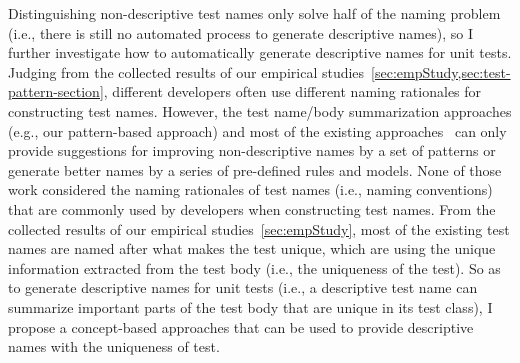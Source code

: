 Distinguishing non-descriptive test names only solve half of the naming problem (i.e., there is still no automated process to generate descriptive names), so I further investigate how to automatically generate descriptive names for unit tests.
%
Judging from the collected results of our empirical studies~\cref{sec:empStudy,sec:test-pattern-section}, different developers often use different naming rationales for constructing test names.
%
However, the test name\slash body summarization approaches (e.g., our pattern-based approach) and most of the existing approaches~\cite{arcuri2014automated,zhang2015automatically,allamanis2015suggesting,daka2017generating,li2019deepfl} can only provide suggestions for improving non-descriptive names by a set of patterns or generate better names by a series of pre-defined rules and models.
%
None of those work considered the naming rationales of test names (i.e., naming conventions) that are commonly used by developers when constructing test names.
%
From the collected results of our empirical studies~\cref{sec:empStudy}, most of the existing test names are named after what makes the test unique, which are using the unique information extracted from the test body (i.e., the uniqueness of the test).
%
So as to generate descriptive names for unit tests (i.e., a descriptive test name can summarize important parts of the test body that are unique in its test class), I propose a concept-based approaches that can be used to provide descriptive names with the uniqueness of test.


